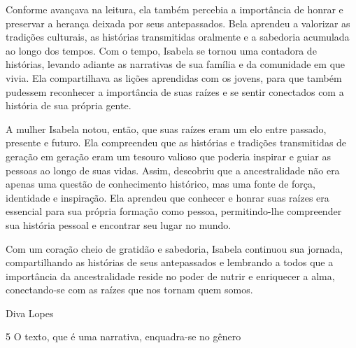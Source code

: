 \begin{itemize}
\begin{itemize}
\begin{escolha}
\begin{escolha}
\begin{escolha}
\begin{escolha}
\begin{escolha}
\begin{escolha}
\begin{escolha}
\begin{escolha}
\begin{escolha}
\begin{escolha}
\begin{escolha}
\begin{escolha}
Conforme avançava na leitura, ela também percebia a importância de
honrar e preservar a herança deixada por seus antepassados. Bela
aprendeu a valorizar as tradições culturais, as histórias transmitidas
oralmente e a sabedoria acumulada ao longo dos tempos. Com o tempo,
Isabela se tornou uma contadora de histórias, levando adiante as
narrativas de sua família e da comunidade em que vivia. Ela
compartilhava as lições aprendidas com os jovens, para que também
pudessem reconhecer a importância de suas raízes e se sentir conectados
com a história de sua própria gente.

A mulher Isabela notou, então, que suas raízes eram um elo entre
passado, presente e futuro. Ela compreendeu que as histórias e tradições
transmitidas de geração em geração eram um tesouro valioso que poderia
inspirar e guiar as pessoas ao longo de suas vidas. Assim, descobriu que
a ancestralidade não era apenas uma questão de conhecimento histórico,
mas uma fonte de força, identidade e inspiração. Ela aprendeu que
conhecer e honrar suas raízes era essencial para sua própria formação
como pessoa, permitindo-lhe compreender sua história pessoal e encontrar
seu lugar no mundo.

Com um coração cheio de gratidão e sabedoria, Isabela continuou sua
jornada, compartilhando as histórias de seus antepassados e lembrando a
todos que a importância da ancestralidade reside no poder de nutrir e
enriquecer a alma, conectando-se com as raízes que nos tornam quem
somos.

Diva Lopes

\num{5} O texto, que é uma narrativa, enquadra-se no gênero

\end{escolha}
\end{escolha}
\end{escolha}
\end{escolha}
\end{escolha}
\end{escolha}
\end{escolha}
\end{escolha}
\end{escolha}
\end{escolha}
\end{escolha}
\end{escolha}
\end{itemize}
\end{itemize}
